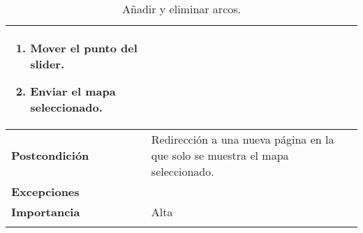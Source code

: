 \begin{longtable}[H]{@{}l|l@{}}
\begin{minipage}[t]{0.71\columnwidth}
		\begin{enumerate}
			\def\labelenumi{\arabic{enumi}.}
			\tightlist
			\item Mover el punto del slider.
			\item Enviar el mapa seleccionado. 
		\end{enumerate}
	\end{minipage}\tabularnewline
	\midrule
	\begin{minipage}[t]{0.23\columnwidth}\raggedright\strut
		\textbf{Postcondición}\strut
	\end{minipage} & \begin{minipage}[t]{0.71\columnwidth}\raggedright\strut
		Redirección a una nueva página en la que solo se muestra el mapa seleccionado.\strut
	\end{minipage}\tabularnewline
	\midrule
	\begin{minipage}[t]{0.23\columnwidth}\raggedright\strut
		\textbf{Excepciones}\strut
	\end{minipage} & \begin{minipage}[t]{0.71\columnwidth}\raggedright
		
	\end{minipage}\tabularnewline
	\midrule
	\begin{minipage}[t]{0.23\columnwidth}\raggedright\strut
		\textbf{Importancia}\strut
	\end{minipage} & \begin{minipage}[t]{0.71\columnwidth}\raggedright\strut
		Alta\strut
	\end{minipage}\tabularnewline
	\bottomrule
	\caption{Añadir y eliminar arcos.}
	\label{cu:3.1}
\end{longtable}
\newpage


